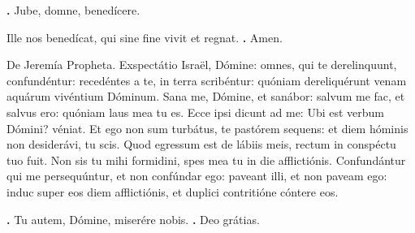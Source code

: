 \begin{small}
\textbf{\Vbar.} Jube, domne, benedícere.

Ille nos benedícat, qui sine fine vivit et regnat. \textbf{\Rbar.} Amen.
\end{small}


De Jeremía Propheta. 
Exspectátio Israël, Dómine: omnes, qui te derelinquunt, confundéntur: recedéntes a te, in terra scribéntur: quóniam dereliquérunt venam aquárum vivéntium Dóminum.
Sana me, Dómine, et sanábor: salvum me fac, et salvus ero: quóniam laus mea tu es.
Ecce ipsi dicunt ad me: Ubi est verbum Dómini? véniat.
Et ego non sum turbátus, te pastórem sequens: et diem hóminis non desiderávi, tu scis. Quod egressum est de lábiis meis, rectum in conspéctu tuo fuit.
Non sis tu mihi formidini, spes mea tu in die afflictiónis.
Confundántur qui me persequúntur, et non confúndar ego: paveant illi, et non paveam ego: induc super eos diem afflictiónis, et duplici contritióne cóntere eos.

\textbf{\Vbar.} Tu autem, Dómine, miserére nobis.
\textbf{\Rbar.} Deo grátias.

